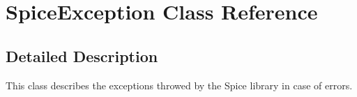 \hypertarget{class_s_p_i_c_e_1_1_spice_exception}{\section{Spice\-Exception Class Reference}
\label{class_s_p_i_c_e_1_1_spice_exception}
}


\subsection{Detailed Description}
This class describes the exceptions throwed by the Spice library in case of errors. 